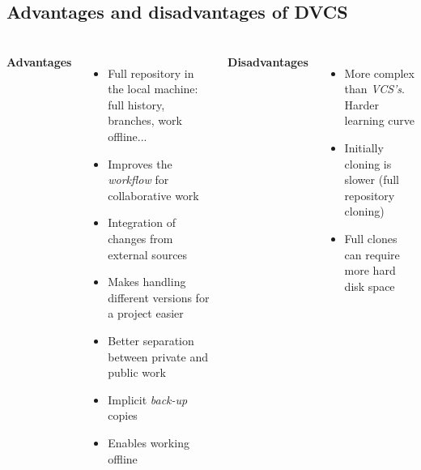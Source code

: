 \begin{frame}
\begin{center}
  \end{center}
\end{frame}


\subsection{Advantages and disadvantages of DVCS}
\begin{frame}
  \frametitle{\insertsubsection}

  \begin{columns}[t]
    \textbf{Advantages}
    \begin{itemize}
    \item Full repository in the local machine: full history,
      branches, work offline...
    \item Improves the \textit{workflow} for collaborative work
    \item Integration of changes from external sources
    \item Makes handling different versions for a project easier
    \item Better separation between private and public work
    \item Implicit \textit{back-up} copies
    \item Enables working offline
    \end{itemize}

    \textbf{Disadvantages}
    \begin{itemize}
    \item More complex than \textit{VCS's}. Harder learning curve
    \item Initially cloning is slower (full repository cloning)
    \item Full clones can require more hard disk space
  \end{itemize}

  \end{columns}
\end{frame}

